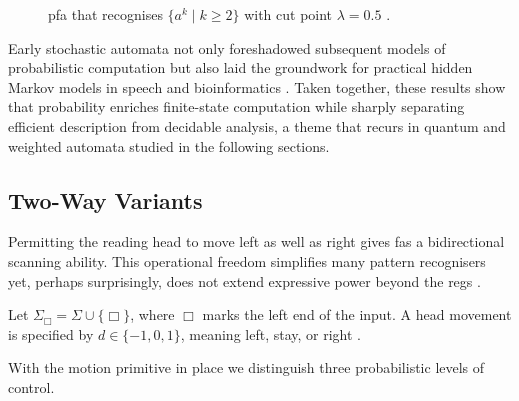 \begin{figure}[H]
    \centering
    \caption{\gls{pfa} that recognises
             $\{a^{k}\mid k\ge2\}$ with cut point $\lambda=0.5$
             \cite{rabin1963probabilistic}.}
    \label{fig:pfa-figure}
\end{figure}

Early stochastic automata not only foreshadowed subsequent models of
probabilistic computation but also laid the groundwork for practical
hidden Markov models in speech and bioinformatics
\cite{rabin1963probabilistic,paz2014introduction}.  Taken together, these results show that
probability enriches finite-state computation while sharply separating
efficient description from decidable analysis, a theme that recurs in
quantum and weighted automata studied in the following sections.

\subsection{Two-Way Variants}\label{subsec:two-way}

Permitting the reading head to move left as well as right
gives \glspl{fa} a bidirectional scanning ability.
This operational freedom simplifies many pattern recognisers
yet, perhaps surprisingly, does not extend expressive power
beyond the \glspl{reg}
\cite{shepherdson1959reduction}.

\begin{definition}\label{def:two-way-head}
Let $\Sigma_{\Box}=\Sigma\cup\{\Box\}$, where $\Box$ marks the left
end of the input.  A head movement is specified by
$d\in\{-1,0,1\}$, meaning
left, stay, or right
\cite{shepherdson1959reduction}.
\end{definition}

With the motion primitive in place we distinguish three probabilistic
levels of control.

